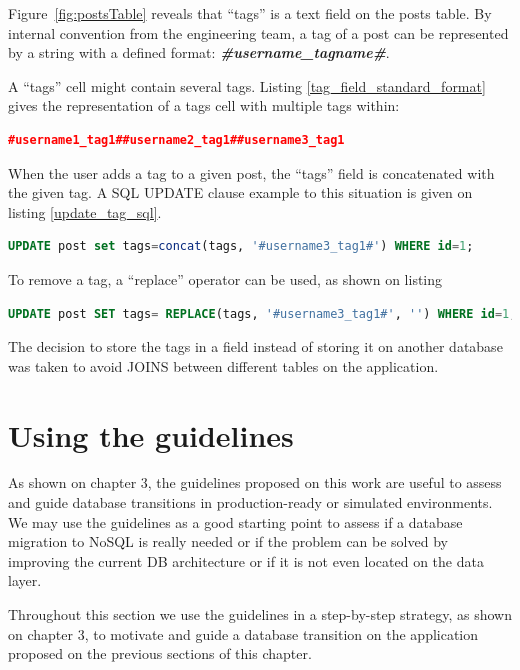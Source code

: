 Figure~\ref{fig:postsTable} reveals that ``tags'' is a text field on the posts table. By internal convention from the engineering team, a tag of a post can be represented by a string with a defined format: \textbf{\textit{\#username\_tagname\#}}.

A ``tags'' cell might contain several tags. Listing \ref{tag_field_standard_format} gives the representation of a tags cell with multiple tags within: 

\begin{lstlisting}[language=json,firstnumber=1, caption=Tag field standard format, label=tag_field_standard_format]
#username1_tag1##username2_tag1##username3_tag1 
\end{lstlisting}

When the user adds a tag to a given post, the ``tags'' field is concatenated with the given tag. A SQL UPDATE clause example to this situation is given on listing \ref{update_tag_sql}.

\begin{lstlisting}[language=sql,firstnumber=1, caption=Update Tag - SQL, label=update_tag_sql]
UPDATE post set tags=concat(tags, '#username3_tag1#') WHERE id=1; 
\end{lstlisting}

To remove a tag, a ``replace'' operator can be used, as shown on listing 

\begin{lstlisting}[language=sql,firstnumber=1, caption=Remove Tag - SQL, label=remove_tag_sql]
UPDATE post SET tags= REPLACE(tags, '#username3_tag1#', '') WHERE id=1; 
\end{lstlisting}

The decision to store the tags in a field instead of storing it on another database was taken to avoid JOINS between different tables on the application. 

\section{Using the guidelines}
As shown on chapter 3, the guidelines proposed on this work are useful to assess and guide database transitions in production-ready or simulated environments. We may use the guidelines as a good starting point to assess if a database migration to NoSQL is really needed or if the problem can be solved by improving the current DB architecture or if it is not even located on the data layer.

Throughout this section we use the guidelines in a step-by-step strategy, as shown on chapter 3, to motivate and guide a database transition on the application proposed on the previous sections of this chapter. 

